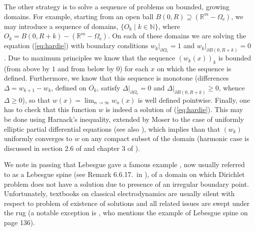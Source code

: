\documentclass[12pt]{iopart}
\newcommand{\dd}{\partial}
\newcommand{\0}{\vct{0}}
\newcommand{\nn}{\mathds{N}}
\newcommand{\rr}{\mathds{R}}
\newcommand{\cl}[1]{\overline{#1}}
\theoremstyle{plain} \newtheorem{tm}{Theorem}[section]
\theoremstyle{plain} \newtheorem{lm}[tm]{Lemma}
\theoremstyle{definition} \newtheorem{defn}[tm]{Definition}
\begin{document}
The other strategy is to solve a sequence of problems on bounded, growing domains. For example, starting from an open ball $B(0,R) \supseteq (\rr^m - \Omega_{\mathrm{e}})$, we may introduce a sequence of domains, $\{O_k \mid k\in\nn\}$, where $O_k = B(0,R+k) - (\rr^m - \Omega_{\mathrm{e}})$. On each of these domains we are solving the equation (\ref{eq:hardie}) with boundary conditions $w_k|_{\dd\Omega_{\mathrm{e}}} = 1$ and $w_k|_{\dd B(0,R+k)} = 0$. Due to maximum principles we know that the sequence $(w_k(x))_k$ is bounded (from above by $1$ and from below by $0$) for each $x$ on which the sequence is defined. Furthermore, we know that this sequence is monotone (differences $\Delta = w_{k+1} - w_k$, defined on $\cl{O_k}$, satisfy $\Delta|_{\dd\Omega_{\mathrm{e}}} = 0$ and $\Delta|_{\dd B(0,R+k)} \ge 0$, whence $\Delta \ge 0$), so that $w(x) = \lim_{n\to\infty} w_n(x)$ is well defined pointwise. Finally, one has to check that this function $w$ is indeed a solution of (\ref{eq:hardie}). This may be done using Harnack's inequality, extended by Moser \cite{Moser61} to the case of uniformly elliptic partial differential equations (see also \cite{GT,Evans}), which implies than that $(w_k)$ uniformly converges to $w$ on any compact subset of the domain (harmonic case is discussed in section 2.6 of \cite{GT} and chapter 3 of \cite{ABR}).

\medskip

We note in passing that Lebesgue gave a famous example \cite{Lebesgue13}, now usually referred to as a Lebesgue spine (see Remark 6.6.17.~in \cite{AG}), of a domain on which Dirichlet problem does not have a solution due to presence of an irregular boundary point. Unfortunately, textbooks on classical electrodynamics are usually silent with respect to problem of existence of solutions and all related issues are swept under the rug (a notable exception is \cite{Bladel}, who mentions the example of Lebesgue spine on page 136).

\medskip
\end{document}
